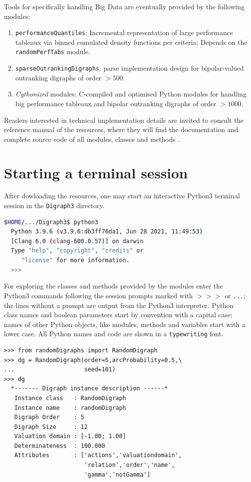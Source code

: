 \noindent Tools for specifically handling Big Data are eventually provided by the following modules:

\begin{enumerate}[leftmargin=0.75cm]
\item \texttt{performanceQuantiles}: Incremental representation of large performance tableaux via binned cumulated density functions per criteria; Depends on the \texttt{randomPerfTabs} module.
\item \texttt{sparseOutrankingDigraphs}: parse implementation design for bipolar-valued outranking digraphs of order $> 500$.
\item \emph{Cythonized} modules: C-compiled and optimised Python modules for handling big performance tableaux and bipolar outranking digraphs of order $> 1000$.
\end{enumerate}

Readers interested in technical implementation details are invited to consult the reference manual of the \Digraph resources, where they will find the documentation and complete source code of all \Digraph modules, classes and methods \citep{BIS-2021b}. 

\section{Starting a \Digraph terminal session}
\label{sec:1.3}
After dowloading the \Digraph resources, one may start an interactive Python3 terminal session in the \texttt{Digraph3} directory.
\begin{lstlisting}[language=sh, backgroundcolor=\color{White}, numbers=none]
  $HOME/.../Digraph3$ python3
  Python 3.9.6 (v3.9.6:db3ff76da1, Jun 28 2021, 11:49:53) 
  [Clang 6.0 (clang-600.0.57)] on darwin
  Type "help", "copyright", "credits" or 
     "license" for more information.
  >>>
\end{lstlisting}

For exploring the classes and methods provided by the \Digraph modules enter the Python3 commands following the session prompts marked with $>>>$ or \texttt{...}; the lines without a prompt are output from the Python3 interpreter. Python class names and boolean parameters start by convention with a capital case; names of other Python objects, like modules, methods and variables start with a lower case. All Python names and code are shown in a \texttt{typewriting} font.
\begin{lstlisting}[caption={Generating a digraph instance},label=list:1.1]
>>> from randomDigraphs import RandomDigraph
>>> dg = RandomDigraph(order=5,arcProbability=0.5,\
...                    seed=101)
>>> dg
  *------- Digraph instance description ------*
   Instance class   : RandomDigraph
   Instance name    : randomDigraph
   Digraph Order    : 5
   Digraph Size     : 12
   Valuation domain : [-1.00; 1.00]
   Determinateness  : 100.000
   Attributes       : ['actions','valuationdomain',
                       'relation','order','name',
                       'gamma','notGamma']
\end{lstlisting}

